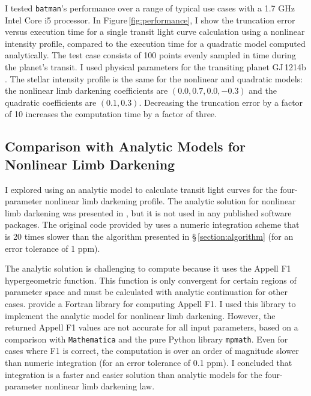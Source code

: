 \documentclass[12pt,preprint]{aastex}
\begin{document}
I tested \texttt{batman}'s performance over a range of typical use cases with a 1.7 GHz Intel Core i5 processor.  In Figure\,\ref{fig:performance}, I show the truncation error versus execution time for a single transit light curve calculation using a nonlinear intensity profile, compared to the execution time for a quadratic model computed analytically.  The test case consists of 100 points evenly sampled in time during the planet's transit. I used physical parameters for the transiting planet GJ\,1214b \citep{kreidberg14a}. The stellar intensity profile is the same for the nonlinear and quadratic models: the nonlinear limb darkening coefficients are $(0.0, 0.7, 0.0, -0.3)$ and the quadratic coefficients are $(0.1, 0.3)$.  Decreasing the truncation error by a factor of 10 increases the computation time by a factor of three.

\subsection{Comparison with Analytic Models for Nonlinear Limb Darkening}
I explored using an analytic model to calculate transit light curves for the four-parameter nonlinear limb darkening profile.  The analytic solution for nonlinear limb darkening was presented in \cite{mandel02}, but it is not used in any published software packages. The original code provided by \cite{mandel02} uses a numeric integration scheme that is 20 times slower than the algorithm presented in \S\,\ref{section:algorithm} (for an error tolerance of 1 ppm). 

The analytic solution is challenging to compute because it uses the Appell F1 hypergeometric function.  This function is only convergent for certain regions of parameter space and must be calculated with analytic continuation for other cases. \cite{colavecchia04} provide a Fortran library for computing Appell F1.  I used this library to implement the analytic model for nonlinear limb darkening. However, the returned Appell F1 values are not accurate for all input parameters, based on a comparison with \texttt{Mathematica} and the pure Python library \texttt{mpmath}.  Even for cases where F1 is correct, the computation is over an order of magnitude slower than numeric integration (for an error tolerance of 0.1 ppm).  I concluded that integration is a faster and easier solution than analytic models for the four-parameter nonlinear limb darkening law.
\end{document}
